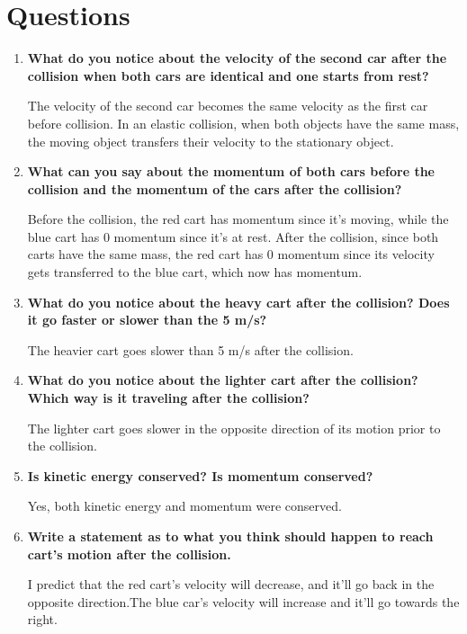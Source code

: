 
 \section{Questions}

\vspace{-0.5cm}
\singlespacing

\begin{enumerate}
	\item \textbf{What do you notice about the velocity of the second car after the collision when both cars are identical and one starts from rest?}

	The velocity of the second car becomes the same velocity as the first car before collision. In an elastic collision, when both objects have the same mass, the moving object transfers their velocity to the stationary object. 

	\item \textbf{What can you say about the momentum of both cars before the collision and the momentum of the cars after the collision?}

	Before the collision, the red cart has momentum since it's moving, while the blue cart has 0 momentum since it's at rest. After the collision, since both carts have the same mass, the red cart has 0 momentum since its velocity gets transferred to the blue cart, which now has momentum.

\item \textbf{What do you notice about the heavy cart after the collision? Does it go faster or slower than the 5 m/s?}

The heavier cart goes slower than 5 m/s after the collision. 

\item \textbf{What do you notice about the lighter cart after the collision? Which way is it traveling after the collision?}

	The lighter cart goes slower in the opposite direction of its motion prior to the collision. 


\item \textbf{Is kinetic energy conserved? Is momentum conserved?}

	Yes, both kinetic energy and momentum were conserved.


\item \textbf{Write a statement as to what you think should happen to reach cart's motion after the collision.}

	I predict that the red cart's velocity will decrease, and it'll go back in the opposite direction.The blue car's velocity will increase and it'll go towards the right.	
	

\end{enumerate}
